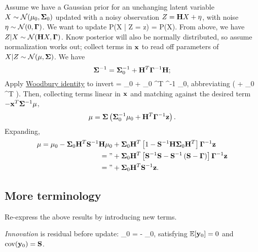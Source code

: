 \documentclass[notitlepage,openany,11pt]{report}
\DeclareMathOperator{\cov}{cov}
\numberwithin{equation}{section}
\theoremstyle{plain}%
\begin{document}
Assume we have a Gaussian prior for an unchanging latent variable $X \sim \mathcal{N}(\mathbf{\mu}_0, \mathbf{\Sigma}_0)$ updated with a noisy observation $Z = \mathbf{H}X + \mathbf{\eta}$, with noise $\eta \sim \mathcal{N}(0, \mathbf{\Gamma})$. We want to update
\be
P(X | Z = z) =  P(X).
\ee
From above, we have $Z | X \sim \mathcal{N}(\mathbf{H}X, \mathbf{\Gamma})$. Know posterior will also be normally distributed, so assume normalization works out; collect terms in $\mathbf{x}$ to read off parameters of $X | Z \sim \mathcal{N}(\mathbf{\mu}, \mathbf{\Sigma})$. We have
\begin{equation}
\label{eq-kal-1}
\mathbf{\Sigma}^{-1} = \mathbf{\Sigma}_0^{-1} + \mathbf{H}^{T} \mathbf{\Gamma}^{-1} \mathbf{H};
\end{equation}
Apply \href{https://en.wikipedia.org/wiki/Woodbury_matrix_identity}{Woodbury identity} to invert
\be
\mbf{\Sigma} = \mbf{\Sigma}_0 + \mbf{\Sigma}_0 ^{T} ^{-1}  \mbf{\Sigma}_0,
\ee
abbreviating
\be
{} \equiv \left( \mbf{\Gamma} +  \mbf{\Sigma}_{0} ^{T} \right).
\ee
Then, collecting terms linear in $\mathbf{x}$ and matching against the desired term $- \mathbf{x}^{T} \mathbf{\Sigma}^{-1} \mathbf{\mu}$,
\begin{equation}
\label{eq-kal-2}
\mathbf{\mu} = \mathbf{\Sigma}\left( \mathbf{\Sigma}_0^{-1} \mathbf{\mu}_{0} + \mathbf{H}^{T} \mathbf{\Gamma}^{-1}\mathbf{z} \right).
\end{equation}
Expanding,
\begin{align*}
\mathbf{\mu} = \mathbf{\mu}_0 - \mathbf{\Sigma}_0 \mathbf{H}^{T} \mathbf{S}^{-1} \mathbf{H} \mathbf{\mu}_0 &+ \mathbf{\Sigma}_0 \mathbf{H}^{T} \left[ 1 - \mathbf{S}^{-1} \mathbf{H} \mathbf{\Sigma}_{0} \mathbf{H}^{T} \right] \mathbf{\Gamma}^{-1} \mathbf{z} \\
 = \text{''} &+ \mathbf{\Sigma}_0 \mathbf{H}^{T} \left[ \mathbf{S}^{-1} \mathbf{S} - \mathbf{S}^{-1} \left( \mathbf{S} - \mathbf{\Gamma} \right) \right] \mathbf{\Gamma}^{-1} \mathbf{z} \\
  = \text{''} &+ \mathbf{\Sigma}_0 \mathbf{H}^{T} \mathbf{S}^{-1} \mathbf{z}.
\end{align*}

\subsection{More terminology}
Re-express the above results by introducing new terms. 

\emph{Innovation} is residual before update:
\be
{}_0 =  -  \mbf{\mu}_0,
\ee
satisfying $\mathbb{E}[\mathbf{y}_0] = 0$ and $\cov(\mbf{y}_0) = \mbf{S}$. 
\end{document}
